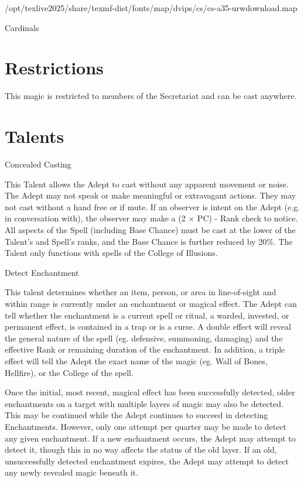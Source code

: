 /opt/texlive2025/share/texmf-dist/fonts/map/dvips/cs/cs-a35-urwdownload.map\documentclass{report}
\begin{document}
\begin{College}{Cardinals}

\section{Restrictions}

This magic is restricted to members of the Secretariat and can
be cast anywhere.

\section{Talents}

\begin{talent}[T-1]{Concealed Casting}
\begin{effects}
This Talent allows the Adept to cast without any apparent movement or
noise.  The Adept may not speak or make meaningful or extravagant
actions. They may not cast without a hand free or if mute.  If an
observer is intent on the Adept (e.g. in conversation with), the
observer may make a (2 × PC) - Rank check to notice. All aspects of
the Spell (including Base Chance) must be cast at the lower of the
Talent’s and Spell’s ranks, and the Base Chance is further reduced by
20\%. The Talent only functions with spells of the College of
Illusions.
\end{effects}
\end{talent}

\begin{talent}[T-2]{Detect Enchantment}

\begin{effects}
This talent determines whether an item, person, or area in
line-of-sight and within range is currently under an enchantment or
magical effect.  The Adept can tell whether the enchantment is a
current spell or ritual, a warded, invested, or permanent effect, is
contained in a trap or is a curse.  A double effect will reveal the
general nature of the spell (eg. defensive, summoning, damaging) and
the effective Rank or remaining duration of the enchantment.  In
addition, a triple effect will tell the Adept the exact name of the
magic (eg. Wall of Bones, Hellfire), or the College of the spell.

Once the initial, most recent, magical effect has been successfully
detected, older enchantments on a target with multiple layers of magic
may also be detected.  This may be continued while the Adept continues
to succeed in detecting Enchantments.  However, only one attempt per
quarter may be made to detect any given enchantment.  If a new
enchantment occurs, the Adept may attempt to detect it, though this in
no way affects the status of the old layer.  If an old, unsuccessfully
detected enchantment expires, the Adept may attempt to detect any
newly revealed magic beneath it.


\end{effects}
\end{talent}
\end{College}
\end{document}
